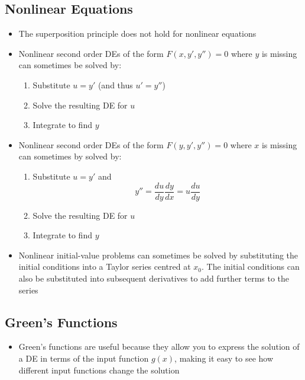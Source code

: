 \documentclass{article}
\begin{document}
\subsection{Nonlinear Equations}

\begin{itemize}
  \item The superposition principle does not hold for nonlinear equations

  \item Nonlinear second order DEs of the form $F(x, y', y'') = 0$ where $y$ is missing can sometimes be solved by:

        \begin{enumerate}
          \item Substitute $u = y'$ (and thus $u' = y''$)

          \item Solve the resulting DE for $u$

          \item Integrate to find $y$
        \end{enumerate}

  \item Nonlinear second order DEs of the form $F(y, y', y'') = 0$ where $x$ is missing can sometimes by solved by:

        \begin{enumerate}
          \item Substitute $u = y'$ and \[y'' = \frac{du}{dy} \frac{dy}{dx} = u \frac{du}{dy}\]

          \item Solve the resulting DE for $u$

          \item Integrate to find $y$
        \end{enumerate}

  \item Nonlinear initial-value problems can sometimes be solved by substituting the initial conditions into a Taylor series centred at $x_0$. The initial conditions can also be substituted into subsequent derivatives to add further terms to the series
\end{itemize}

\setcounter{subsection}{9}
\subsection{Green's Functions}

\begin{itemize}
  \item Green's functions are useful because they allow you to express the solution of a DE in terms of the input function $g(x)$, making it easy to see how different input functions change the solution
\end{itemize}
\end{document}
